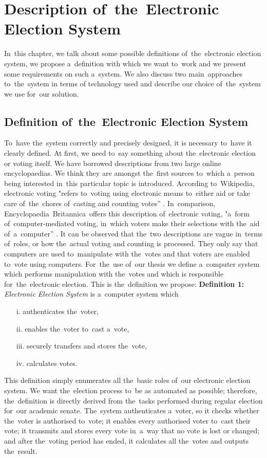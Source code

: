 \chapter{Description of~the~Electronic Election System}
\label{kap:definition}

In~this chapter, we talk about some possible definitions of~the~electronic election system, we propose a~definition with which we want to~work and we present some requirements on such a~system. We also discuss two main~approaches to~the~system in terms of technology used and describe our choice of~the~system we use for~our solution.

\section{Definition of~the~Electronic Election System}

\label{sec:def}

To~have the~system correctly and precisely designed, it is necessary to~have it clearly defined. At first, we need to~say something about the~electronic election or voting itself. We have borrowed descriptions from two large online encyclopaedias. We think they are amongst the~first sources to~which a~person being interested in~this particular topic is introduced. According to~Wikipedia, electronic voting "refers to~voting using electronic means to~either aid or take care of~the~chores of~casting and counting votes” \cite{Wiki}. In~comparison, Encyclopaedia~Britannica~offers this description of~electronic voting, "a~form of~computer-mediated voting, in~which voters make their selections with the~aid of~a~computer” \cite{Brit}. It can be observed that the~two descriptions are vague in~terms of~roles, or how the~actual voting and counting is processed. They only say that computers are used to~manipulate with the~votes and that voters are enabled to~vote using computers. For~the~use of~our thesis we define a~computer system which performs manipulation with the~votes and which is responsible for~the~electronic election. This is the~definition we propose:
\smallbreak
\textbf{Definition 1:} \emph{Electronic Election System} is a~computer system which
\begin{itemize}
\item[i.] authenticates the~voter,
\item[ii.] enables the~voter to~cast a~vote,
\item[iii.] securely transfers and stores the~vote,
\item[iv.] calculates votes.
\end{itemize}
\bigbreak
This definition simply enumerates all the~basic roles of~our electronic election system. We want the~election process to~be as automated as possible; therefore, the~definition is directly derived from the~tasks performed during regular election for~our academic senate. The~system authenticates a~voter, so it checks whether the~voter is authorised to~vote; it enables every authorised voter to~cast their vote; it transmits and stores every vote in~a~way that no vote is lost or changed; and after the~voting period has ended, it calculates all the~votes and outputs the~result.

